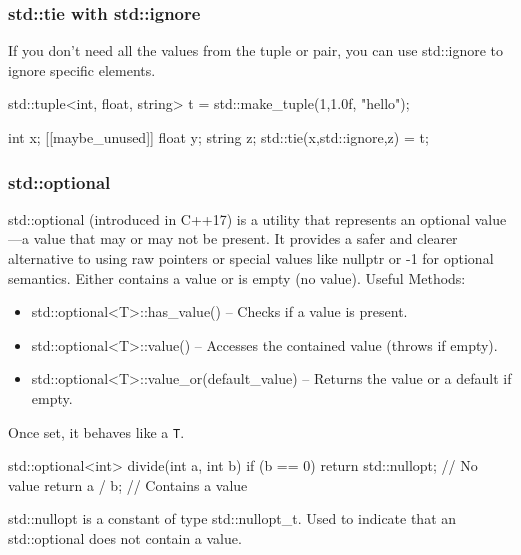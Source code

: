 \documentclass{report}
\begin{document}
     \bigbreak \noindent 
     \subsubsection{std::tie with std::ignore}
     \bigbreak \noindent 
     If you don’t need all the values from the tuple or pair, you can use std::ignore to ignore specific elements.
     \bigbreak \noindent 
     \begin{cppcode}
         std::tuple<int, float, string> t = std::make_tuple(1,1.0f, "hello");

         int x; [[maybe_unused]] float y; string z;
         std::tie(x,std::ignore,z) = t;
     \end{cppcode}

     \bigbreak \noindent 
     \subsubsection{std::optional}
     \bigbreak \noindent 
     std::optional (introduced in C++17) is a utility that represents an optional value—a value that may or may not be present. It provides a safer and clearer alternative to using raw pointers or special values like nullptr or -1 for optional semantics.
     \bigbreak \noindent 
     Either contains a value or is empty (no value).
     \bigbreak \noindent 
     Useful Methods:
     \begin{itemize}
         \item std::optional<T>::has\_value() – Checks if a value is present.
         \item std::optional<T>::value() – Accesses the contained value (throws if empty).
         \item std::optional<T>::value\_or(default\_value) – Returns the value or a default if empty.
     \end{itemize}
     \bigbreak \noindent 
     Once set, it behaves like a \texttt{T}.
     \bigbreak \noindent 
     \begin{cppcode}
         std::optional<int> divide(int a, int b) {
             if (b == 0) return std::nullopt; // No value
             return a / b; // Contains a value
         }
     \end{cppcode}
     \bigbreak \noindent 
     std::nullopt is a constant of type std::nullopt\_t. Used to indicate that an std::optional does not contain a value.

     \pagebreak 
     \bigbreak \noindent 
\end{document}
